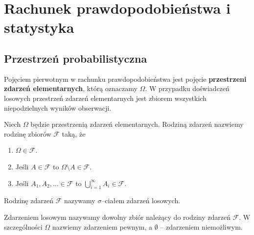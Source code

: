 \documentclass{myclass}
\numberwithin{equation}{subsection}
\begin{document}
\section{Rachunek prawdopodobieństwa i statystyka}


\subsection{Przestrzeń probabilistyczna}

Pojęciem pierwotnym w rachunku prawdopodobieństwa jest pojęcie \textbf{przestrzeni zdarzeń
elementarnych}, którą oznaczamy \(\Omega\). W przypadku doświadczeń losowych przestrzeń zdarzeń
elementarnych jest zbiorem wszystkich niepodzielnych wyników obserwacji.

\begin{definition}

Niech \(\Omega\) będzie przestrzenią zdarzeń elementarnych. Rodziną zdarzeń nazwiemy rodzinę zbiorów
\(\mathcal{F}\) taką, że
\begin{enumerate}
    
    \item \(\Omega \in \mathcal{F}\).
    
    \item Jeśli \(A \in \mathcal{F}\) to \(\Omega \setminus A \in \mathcal{F}\).
    
    \item Jeśli \(A_1,A_2,\ldots \in \mathcal{F}\) to \(\bigcup_{i=1}^\infty A_i \in \mathcal{F}\).

\end{enumerate}

Rodzinę zdarzeń \(\mathcal{F}\) nazywamy \(\sigma\)--ciałem zdarzeń losowych.

\end{definition}

\begin{definition}
    Zdarzeniem losowym nazywamy dowolny zbiór należący do rodziny zdarzeń \(\mathcal{F}\). W
    szczególności \(\Omega\) nazwiemy zdarzeniem pewnym, a \(\emptyset\) -- zdarzeniem niemożliwym.
\end{definition}
\end{document}
